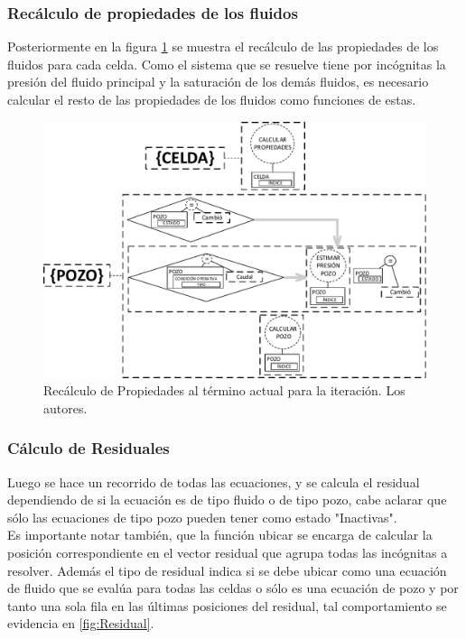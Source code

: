 \subsubsection{Recálculo de propiedades de los fluidos}\label{subsec:PS_TimeK}
Posteriormente en la figura \ref{fig:TimeK} se muestra el recálculo de las propiedades de los fluidos para cada celda. Como el sistema que se resuelve tiene por incógnitas la presión del fluido principal y la saturación de los demás fluidos, es necesario calcular el resto de las propiedades de los fluidos como funciones de estas. \\%

\begin{figure}[h]
	\centering%
	\includegraphics[width=\linewidth]{Fig/TiempoK.pdf}%
	\caption[Recálculo de Propiedades al término actual para la iteración.]{Recálculo de Propiedades al término actual para la iteración. Los autores.} \label{fig:TimeK}
\end{figure}

\subsubsection{Cálculo de Residuales}\label{subsec:Residual}
Luego se hace un recorrido de todas las ecuaciones, y se calcula el residual dependiendo de si la ecuación es de tipo fluido o de tipo pozo, cabe aclarar que sólo las ecuaciones de tipo pozo pueden tener como estado "Inactivas".\\

Es importante notar también, que la función ubicar se encarga de calcular la posición correspondiente en el vector residual que agrupa todas las incógnitas a resolver. Además el tipo de residual indica si se debe ubicar como una ecuación de fluido que se evalúa para todas las celdas o sólo es una ecuación de pozo y por tanto una sola fila en las últimas posiciones del residual, tal comportamiento se evidencia en \ref{fig:Residual}. \\ %

